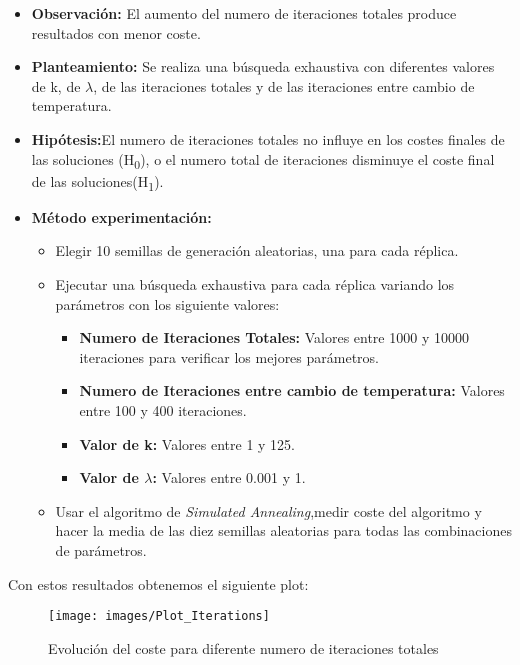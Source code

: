 \documentclass{article}
\begin{document}
\begin{enumerate}
  \begin{itemize}
    \item \textbf{Observación:} El aumento del numero de iteraciones totales produce resultados con menor coste.
    \item \textbf{Planteamiento:} Se realiza una búsqueda exhaustiva con diferentes valores de k, de ${\lambda}$, de las iteraciones totales y de las iteraciones entre cambio de temperatura.
    \item \textbf{Hipótesis:}El numero de iteraciones totales no influye en los costes finales de las soluciones (H\textsubscript{0}), o el numero total de iteraciones disminuye el coste final de las soluciones(H\textsubscript{1}).
    \item \textbf{Método experimentación:} \begin{itemize}
        \item Elegir 10 semillas de generación aleatorias, una para cada réplica.
        \item Ejecutar una búsqueda exhaustiva para cada réplica variando los parámetros con los siguiente valores:
        \begin{itemize}
            \item \textbf{Numero de Iteraciones Totales:} Valores entre 1000 y 10000 iteraciones para verificar los mejores parámetros.
            \item \textbf{Numero de Iteraciones entre cambio de temperatura:} Valores entre 100 y 400 iteraciones.
            \item \textbf{Valor de k:} Valores entre 1 y 125.
            \item \textbf{Valor de ${\lambda}$:} Valores entre 0.001 y 1.
        \end{itemize}
        \item Usar el algoritmo de \textit{Simulated Annealing},medir coste del algoritmo y hacer la media de las diez semillas aleatorias para todas las combinaciones de parámetros.
    \end{itemize}
  \end{itemize}

 Con estos resultados obtenemos el siguiente plot:

  \begin{figure}[htp]
    \centering
    \texttt{[image: images/Plot\_Iterations]}\hfill
    \caption{Evolución del coste para diferente numero de iteraciones totales}
  \end{figure}




\end{enumerate}
\end{document}
